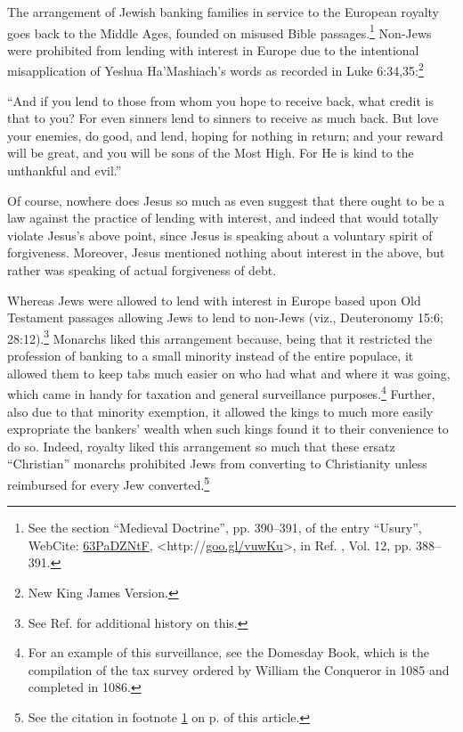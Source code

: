 \documentclass[letterpaper,12pt]{article}
\newcommand{\dsc}{\discretionary{}{}{}}
\newenvironment{squote}
  {\small\quote}
  {\endquote\normalsize}
\begin{document}
The arrangement of Jewish banking families in service to the European royalty goes back to the Middle Ages, founded on misused Bible passages.\footnote{\label{foot:RoyaltyAndJews}See the section ``Medieval Doctrine'', pp. 390--391, of the entry ``Usury'', WebCite: \href{http://www.webcitation.org/63PaDZNtF}{63PaDZNtF}, \textless http://\dsc \href{http://goo.gl/vuwKu}{goo.gl/\dsc vuwKu}\textgreater , in Ref. , Vol. 12, pp. 388--391.} Non-Jews were prohibited from lending with interest in Europe due to the intentional misapplication of Yeshua Ha'Mashiach's words as recorded in Luke 6:34,35:\footnote{New King James Version.}

\begin{squote}
``And if you lend to those from whom you hope to receive back, what credit is that to you? For even sinners lend to sinners to receive as much back. But love your enemies, do good, and lend, hoping for nothing in return; and your reward will be great, and you will be sons of the Most High. For He is kind to the unthankful and evil.''
\end{squote}

Of course, nowhere does Jesus so much as even suggest that there ought to be a law against the practice of lending with interest, and indeed that would totally violate Jesus's above point, since Jesus is speaking about a voluntary spirit of forgiveness. Moreover, Jesus mentioned nothing about interest in the above, but rather was speaking of actual forgiveness of debt.

Whereas Jews were allowed to lend with interest in Europe based upon Old Testament passages allowing Jews to lend to non-Jews (viz., Deuteronomy 15:6; 28:12).\footnote{See Ref.  for additional history on this.} Monarchs liked this arrangement because, being that it restricted the profession of banking to a small minority instead of the entire populace, it allowed them to keep tabs much easier on who had what and where it was going, which came in handy for taxation and general surveillance purposes.\footnote{For an example of this surveillance, see the Domesday Book, which is the compilation of the tax survey ordered by William the Conqueror in 1085 and completed in 1086.} Further, also due to that minority exemption, it allowed the kings to much more easily expropriate the bankers' wealth when such kings found it to their convenience to do so. Indeed, royalty liked this arrangement so much that these ersatz ``Christian'' monarchs prohibited Jews from converting to Christianity unless reimbursed for every Jew converted.\footnote{See the citation in footnote \ref{foot:RoyaltyAndJews} on p. \pageref{foot:RoyaltyAndJews} of this article.}
\end{document}
